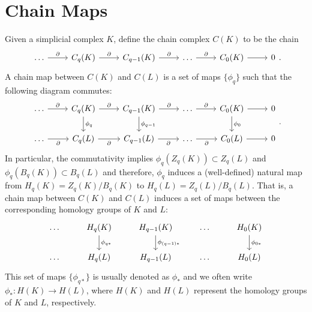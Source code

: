 \section{Chain Maps}
Given a simplicial complex $K$, define the chain complex $C(K)$ to be the chain
\[
    \begin{tikzcd}
        \dots \arrow[r, "\partial"] & C_q(K) \arrow[r, "\partial"] & C_{q-1}(K) \arrow[r, "\partial"] & \dots \arrow[r, "\partial"] & C_0(K) \arrow[r] & 0
    \end{tikzcd}.
\]
A chain map between $C(K)$ and $C(L)$ is a set of maps $\{\phi_q\}$ such that the following diagram commutes:
\[
    \begin{tikzcd}
        \dots \arrow[r, "\partial"]  & C_q(K) \arrow[r, "\partial"] \arrow[d, "\phi_q"] & C_{q-1}(K) \arrow[r, "\partial"] \arrow[d, "\phi_{q-1}"] & \dots \arrow[r, "\partial"]  & C_0(K) \arrow[r] \arrow[d, "\phi_0"] & 0 \\
        \dots \arrow[r, "\partial"'] & C_q(L) \arrow[r, "\partial"']                 & C_{q-1}(L) \arrow[r, "\partial"']                     & \dots \arrow[r, "\partial"'] & C_0(L) \arrow[r]                  & 0
    \end{tikzcd}.
\]
In particular, the commutativity implies $\phi_q(Z_q(K)) \subset Z_q(L)$ and $\phi_q(B_q(K)) \subset B_q(L)$ and therefore, $\phi_q$ induces a (well-defined) natural map from $H_q(K) = Z_q(K) / B_q(K)$ to $H_q(L) = Z_q(L) / B_q(L)$. That is, a chain map between $C(K)$ and $C(L)$ induces a set of maps between the corresponding homology groups of $K$ and $L$:
\[
    \begin{tikzcd}
        \dots & H_q(K) \arrow[d, "\phi_{q*}"] & H_{q-1}(K) \arrow[d, "\phi_{(q-1)*}"] & \dots & H_0(K) \arrow[d, "\phi_{0*}"] \\
        \dots & H_q(L)                     & H_{q-1}(L)                         & \dots & H_0(L)                  
    \end{tikzcd}
\]
This set of maps $\{\phi_{q*}\}$ is usually denoted as $\phi_*$ and we often write $\phi_*: H(K) \to H(L)$, where $H(K)$ and $H(L)$ represent the homology groups of $K$ and $L$, respectively.